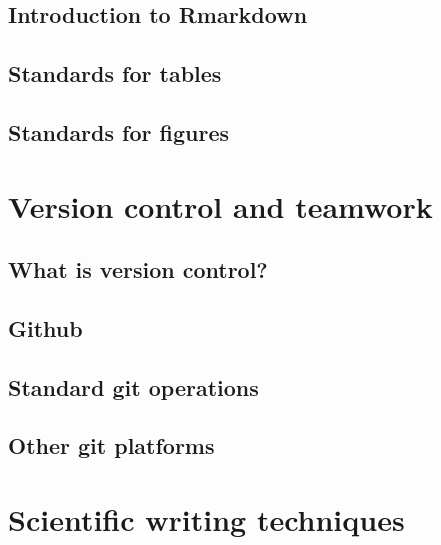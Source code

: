 \documentclass[
]{book}
\begin{document}
\hypertarget{introduction-to-rmarkdown}{%
\section{Introduction to Rmarkdown}\label{introduction-to-rmarkdown}}

\hypertarget{standards-for-tables}{%
\section{Standards for tables}\label{standards-for-tables}}

\hypertarget{standards-for-figures}{%
\section{Standards for figures}\label{standards-for-figures}}

\hypertarget{version-control-and-teamwork}{%
\chapter{Version control and teamwork}\label{version-control-and-teamwork}}

\hypertarget{what-is-version-control}{%
\section{What is version control?}\label{what-is-version-control}}

\hypertarget{github}{%
\section{Github}\label{github}}

\hypertarget{standard-git-operations}{%
\section{Standard git operations}\label{standard-git-operations}}

\hypertarget{other-git-platforms}{%
\section{Other git platforms}\label{other-git-platforms}}

\hypertarget{scientific-writing-techniques}{%
\chapter{Scientific writing techniques}\label{scientific-writing-techniques}}
\end{document}
